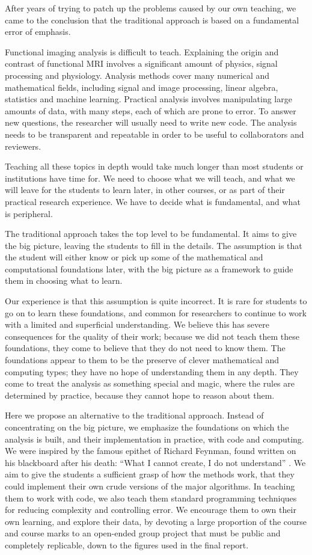 After years of trying to patch up the problems caused by our own teaching, we
came to the conclusion that the traditional approach is based on a fundamental
error of emphasis.

Functional imaging analysis is difficult to teach.  Explaining the origin and
contrast of functional MRI involves a significant amount of physics, signal
processing and physiology.  Analysis methods cover many numerical and
mathematical fields, including signal and image processing, linear algebra,
statistics and machine learning.  Practical analysis involves manipulating
large amounts of data, with many steps, each of which are prone to error.  To
answer new questions, the researcher will usually need to write new code.  The
analysis needs to be transparent and repeatable in order to be useful to
collaborators and reviewers.

Teaching all these topics in depth would take much longer than most students
or institutions have time for.  We need to choose what we will teach, and what
we will leave for the students to learn later, in other courses, or as part of
their practical research experience.  We have to decide what is fundamental,
and what is peripheral.

The traditional approach takes the top level to be fundamental.  It aims to
give the big picture, leaving the students to fill in the details. The
assumption is that the student will either know or pick up some of the
mathematical and computational foundations later, with the big picture as a
framework to guide them in choosing what to learn.

Our experience is that this assumption is quite incorrect.  It is rare for
students to go on to learn these foundations, and common for researchers to
continue to work with a limited and superficial understanding.  We believe
this has severe consequences for the quality of their work; because we did not
teach them these foundations, they come to believe that they do not need to
know them.  The foundations appear to them to be the preserve of clever
mathematical and computing types; they have no hope of understanding them in
any depth.  They come to treat the analysis as something special and magic,
where the rules are determined by practice, because they cannot hope to reason
about them.

Here we propose an alternative to the traditional approach.  Instead of
concentrating on the big picture, we emphasize the foundations on which the
analysis is built, and their implementation in practice, with code and
computing.  We were inspired by the famous epithet of Richard Feynman, found
written on his blackboard after his death: ``What I cannot create, I do not
understand'' \citep{feynman-blackboard}.  We aim to give the students a
sufficient grasp of how the methods work, that they could implement their own
crude versions of the major algorithms.  In teaching them to work with code,
we also teach them standard programming techniques for reducing complexity and
controlling error.  We encourage them to own their own learning, and explore
their data, by devoting a large proportion of the course and course marks to
an open-ended group project that must be public and completely replicable,
down to the figures used in the final report.

